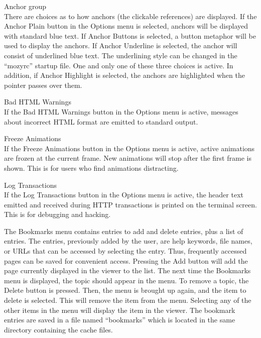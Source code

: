 \begin{description}
\item{\cb Anchor} group\\
There are choices as to how anchors (the clickable references) are
displayed.  If the {\cb Anchor Plain} button in the {\cb Options} menu
is selected, anchors will be displayed with standard blue text.  If
{\cb Anchor Buttons} is selected, a button metaphor will be used to
display the anchors.  If {\cb Anchor Underline} is selected, the
anchor will consist of underlined blue text.  The underlining style
can be changed in the ``{\vt mozyrc}'' startup file.  One and only
one of these three choices is active.  In addition, if {\cb Anchor
Highlight} is selected, the anchors are highlighted when the pointer
passes over them.

\item{\cb Bad HTML Warnings}\\
If the {\cb Bad HTML Warnings} button in the {\cb Options} menu is
active, messages about incorrect HTML format are emitted to standard
output.

\item{\cb Freeze Animations}\\
If the {\cb Freeze Animations} button in the {\cb Options} menu is
active, active animations are frozen at the current frame.  New
animations will stop after the first frame is shown.  This is for
users who find animations distracting.

\item{\cb Log Transactions}\\
If the {\cb Log Transactions} button in the {\cb Options} menu is
active, the header text emitted and received during HTTP transactions
is printed on the terminal screen.  This is for debugging and hacking.
\end{description}

The {\cb Bookmarks} menu contains entries to add and delete entries,
plus a list of entries.  The entries, previously added by the user,
are help keywords, file names, or URLs that can be accessed by
selecting the entry.  Thus, frequently accessed pages can be saved for
convenient access.  Pressing the {\cb Add} button will add the page
currently displayed in the viewer to the list.  The next time the {\cb
Bookmarks} menu is displayed, the topic should appear in the menu.  To
remove a topic, the {\cb Delete} button is pressed.  Then, the menu is
brought up again, and the item to delete is selected.  This will
remove the item from the menu.  Selecting any of the other items in
the menu will display the item in the viewer.  The bookmark entries
are saved in a file named ``{\vt bookmarks}'' which is located in the
same directory containing the cache files.


